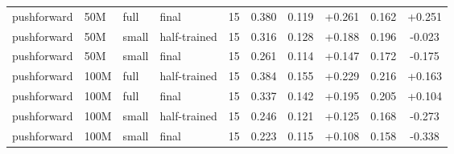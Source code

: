 \begin{tabular*}{\textwidth}{@{\extracolsep{\fill}}llllrccccc@{}}
pushforward & 50M & full & final & 15 & 0.380 & 0.119 & +0.261 & 0.162 & +0.251 \\
pushforward & 50M & small & half-trained & 15 & 0.316 & 0.128 & +0.188 & 0.196 & \mbox{-}0.023 \\
pushforward & 50M & small & final & 15 & 0.261 & 0.114 & +0.147 & 0.172 & \mbox{-}0.175 \\
pushforward & 100M & full & half-trained & 15 & 0.384 & 0.155 & +0.229 & 0.216 & +0.163 \\
pushforward & 100M & full & final & 15 & 0.337 & 0.142 & +0.195 & 0.205 & +0.104 \\
pushforward & 100M & small & half-trained & 15 & 0.246 & 0.121 & +0.125 & 0.168 & \mbox{-}0.273 \\
pushforward & 100M & small & final & 15 & 0.223 & 0.115 & +0.108 & 0.158 & \mbox{-}0.338 \\
\bottomrule
\end{tabular*}
